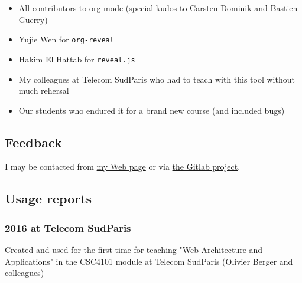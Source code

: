 \documentclass[a4paper]{article}
\begin{document}
\begin{itemize}
\item All contributors to org-mode (special kudos to Carsten Dominik and Bastien Guerry)
\item Yujie Wen for \texttt{org-reveal}
\item Hakim El Hattab for \texttt{reveal.js}
\item My colleagues at Telecom SudParis who had to teach with this tool without much rehersal
\item Our students who endured it for a brand new course (and included bugs)
\end{itemize}

\subsection{Feedback}
\label{sec:orge461708}

I may be contacted from \href{http://www-public.tem-tsp.eu/\~berger\_o/\#sec-3}{my Web page} or via \href{https://gitlab.com/olberger/org-teaching}{the Gitlab project}.

\subsection{Usage reports}
\label{sec:orgb7ac0d7}

\subsubsection{2016 at Telecom SudParis}
\label{sec:orga358cfd}

Created and used for the first time for teaching "Web Architecture and Applications" in the CSC4101 module at Telecom SudParis (Olivier Berger and colleagues)
\end{document}
